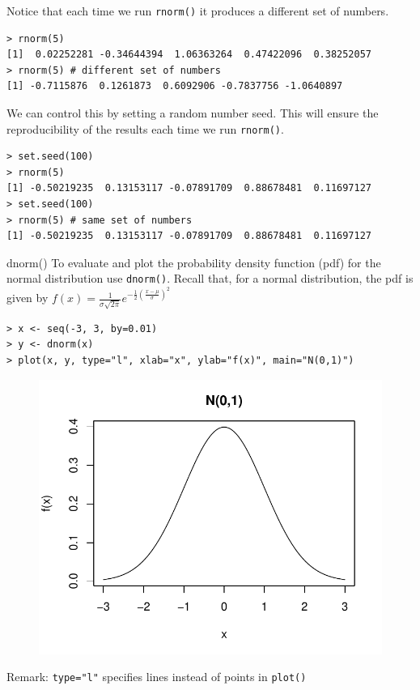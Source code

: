 \documentclass[10pt]{beamer}
\begin{document}
\begin{frame}[fragile]
Notice that each time we run \texttt{rnorm()} it produces a different set of numbers.
\small
\begin{verbatim}
> rnorm(5)
[1]  0.02252281 -0.34644394  1.06363264  0.47422096  0.38252057
> rnorm(5) # different set of numbers
[1] -0.7115876  0.1261873  0.6092906 -0.7837756 -1.0640897
\end{verbatim}
\vspace{10pt}

\normalsize
We can control this by setting a random number seed.  This will ensure the reproducibility of the results each time we run \texttt{rnorm()}.
\small
\begin{verbatim}
> set.seed(100)
> rnorm(5)
[1] -0.50219235  0.13153117 -0.07891709  0.88678481  0.11697127
> set.seed(100)
> rnorm(5) # same set of numbers
[1] -0.50219235  0.13153117 -0.07891709  0.88678481  0.11697127
\end{verbatim}
\end{frame}

\begin{frame}[fragile]{dnorm()}
To evaluate and plot the probability density function (pdf) for the normal distribution use \texttt{dnorm()}.  Recall that, for a normal distribution, the pdf is given by
$f(x) = \frac{1}{\sigma \sqrt{2 \pi}} e^{-\frac{1}{2} \left( \frac{x-\mu}{\sigma} \right) ^2}$

\small
\begin{verbatim}
> x <- seq(-3, 3, by=0.01)
> y <- dnorm(x)
> plot(x, y, type="l", xlab="x", ylab="f(x)", main="N(0,1)")
\end{verbatim}

\begin{figure}[htbp]
\centering
\includegraphics[scale=0.35]{figure/dnorm_z.pdf}
\end{figure}

\small
Remark: \texttt{type="l"} specifies lines instead of points in \texttt{plot()}
\end{frame}
\end{document}
